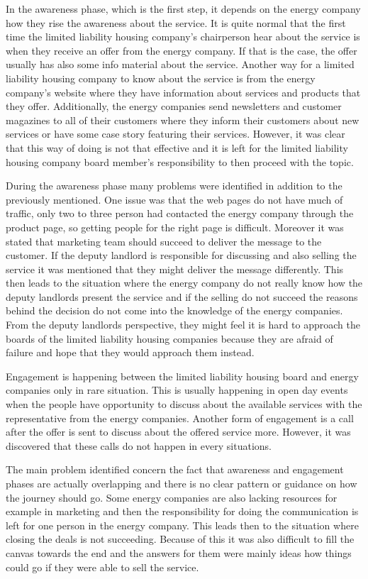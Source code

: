 In the awareness phase, which is the first step, it depends on the energy company how they rise the awareness about the service. It is quite normal that the first time the limited liability housing company's chairperson hear about the service is when they receive an offer from the energy company. If that is the case, the offer usually has also some info material about the service. Another way for a limited liability housing company to know about the service is from the energy company's website where they have information about services and products that they offer. Additionally, the energy companies send newsletters and customer magazines to all of their customers where they inform their customers about new services or have some case story featuring their services. However, it was clear that this way of doing is not that effective and it is left for the limited liability housing company board member's responsibility to then proceed with the topic.

During the awareness phase many problems were identified in addition to the previously mentioned. One issue was that the web pages do not have much of traffic, only two to three person had contacted the energy company through the product page, so getting people for the right page is difficult. Moreover it was stated that marketing team should succeed to deliver the message to the customer. If the deputy landlord is responsible for discussing and also selling the service it was mentioned that they might deliver the message differently. This then leads to the situation where the energy company do not really know how the deputy landlords present the service and if the selling do not succeed the reasons behind the decision do not come into the knowledge of the energy companies. From the deputy landlords perspective, they might feel it is hard to approach the boards of the limited liability housing companies because they are afraid of failure and hope that they would approach them instead. 

Engagement is happening between the limited liability housing board and energy companies only in rare situation. This is usually happening in open day events when the people have opportunity to discuss about the available services with the representative from the energy companies. Another form of engagement is a call after the offer is sent to discuss about the offered service more. However, it was discovered that these calls do not happen in every situations.

The main problem identified concern the fact that awareness and engagement phases are actually overlapping and there is no clear pattern or guidance on how the journey should go. Some energy companies are also lacking resources for example in marketing and then the responsibility for doing the communication is left for one person in the energy company. This leads then to the situation where closing the deals is not succeeding. Because of this it was also difficult to fill the canvas towards the end and the answers for them were mainly ideas how things could go if they were able to sell the service.


